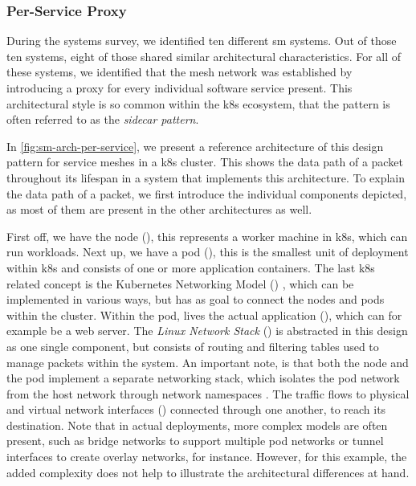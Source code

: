 \subsubsection{Per-Service Proxy}
\label{sec:survey:analysis:architectures:per-service}

During the systems survey, we identified ten different \gls{sm} systems. Out of those ten systems, eight of those shared similar architectural characteristics. For all of these systems, we identified that the mesh network was established by introducing a proxy for every individual software service present. This architectural style is so common within the \gls{k8s} ecosystem, that the pattern is often referred to as the \textit{sidecar pattern}.


In \cref{fig:sm-arch-per-service}, we present a reference architecture of this design pattern for service meshes in a \gls{k8s} cluster. This shows the data path of a packet throughout its lifespan in a system that implements this architecture. To explain the data path of a packet, we first introduce the individual components depicted, as most of them are present in the other architectures as well. 

    


First off, we have the node (), this represents a worker machine in \gls{k8s}, which can run workloads. Next up, we have a \gls{pod} (), this is the smallest unit of deployment within \gls{k8s} and consists of one or more application containers. The last \gls{k8s} related concept is the Kubernetes Networking Model () \cite{kubernetes-cluster-networking}, which can be implemented in various ways, but has as goal to connect the nodes and pods within the cluster. Within the \gls{pod}, lives the actual application (), which can for example be a web server. The \textit{Linux Network Stack} () is abstracted in this design as one single component, but consists of routing and filtering tables used to manage packets within the system. An important note, is that both the node and the \gls{pod} implement a separate networking stack, which isolates the pod network from the host network through network namespaces \cite{man-network-namespaces}. The traffic flows to physical and virtual network interfaces () connected through one another, to reach its destination. Note that in actual deployments, more complex models are often present, such as bridge networks to support multiple pod networks or tunnel interfaces to create overlay networks, for instance. However, for this example, the added complexity does not help to illustrate the architectural differences at hand.


